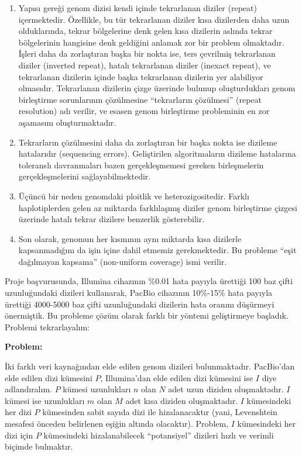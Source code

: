 \documentclass[11pt]{article}
\begin{document}
\begin{enumerate}
\item
  Yapısı gereği genom dizisi kendi içinde tekrarlanan diziler (repeat) içermektedir. Özellikle, bu tür tekrarlanan diziler kısa dizilerden daha uzun olduklarında, tekrar bölgelerine denk gelen kısa dizilerin aslında tekrar bölgelerinin hangisine denk geldiğini anlamak zor bir problem olmaktadır. İşleri daha da zorlaştıran başka bir nokta ise, ters çevrilmiş tekrarlanan diziler (inverted repeat), hatalı tekrarlanan diziler (inexact repeat), ve tekrarlanan dizilerin içinde başka tekrarlanan dizilerin yer alabiliyor olmasıdır. Tekrarlanan dizilerin çizge üzerinde bulunup oluşturdukları genom birleştirme sorunlarının çözülmesine ``tekrarların çözülmesi'' (repeat resolution) adı verilir, ve esasen genom birleştirme probleminin en zor aşamasını oluşturmaktadır.

\item
  Tekrarların çözülmesini daha da zorlaştıran bir başka nokta ise dizileme hatalarıdır (sequencing errors). Geliştirilen algoritmaların dizileme hatalarına toleranslı davranmaları bazen gerçekleşmemesi gereken birleşmelerin gerçekleşmelerini sağlayabilmektedir.

\item
  Üçüncü bir neden genomdaki ploitlik ve heterozigositedir. Farklı haplotiplerden gelen az miktarda farklılaşmış diziler genom birleştirme çizgesi üzerinde hatalı tekrar dizilere benzerlik gösterebilir.

\item
  Son olarak, genomun her kısmının aynı miktarda kısa dizilerle kapsanmadığını da işin içine dahil etmemiz gerekmektedir. Bu probleme ``eşit dağılmayan kapsama'' (non-uniform coverage) ismi verilir.

\end{enumerate}

Proje başvurusunda, Illumina cihazının \%0.01 hata payıyla ürettiği 100 baz çifti uzunluğundaki dizileri kullanarak, PacBio cihazının 10\%-15\% hata payıyla ürettiği 4000-5000 baz çifti uzunluğundaki dizilerin hata oranını düşürmeyi önermiştik. Bu probleme çözüm olarak farklı bir yöntemi geliştirmeye başladık. Problemi tekrarlayalım: 

{\bf Problem:}

İki farklı veri kaynağından elde edilen genom dizileri bulunmaktadır. PacBio'dan elde edilen dizi kümesini $P$, Illumina'dan elde edilen dizi kümesini ise $I$ diye adlandıralım. $P$ kümesi uzunlukları $n$ olan $N$ adet uzun diziden oluşmaktadır. $I$ kümesi ise uzunlukları $m$ olan $M$ adet kısa diziden oluşmaktadır. $I$ kümesindeki her dizi $P$ kümesinden sabit sayıda dizi ile hizalanacaktır (yani, Levenshtein mesafesi önceden belirlenen eşiğin altında olacaktır). Problem, $I$ kümesindeki her dizi için $P$ kümesindeki hizalanabilecek ``potansiyel'' dizileri hızlı ve verimli biçimde bulmaktır.
\end{document}
